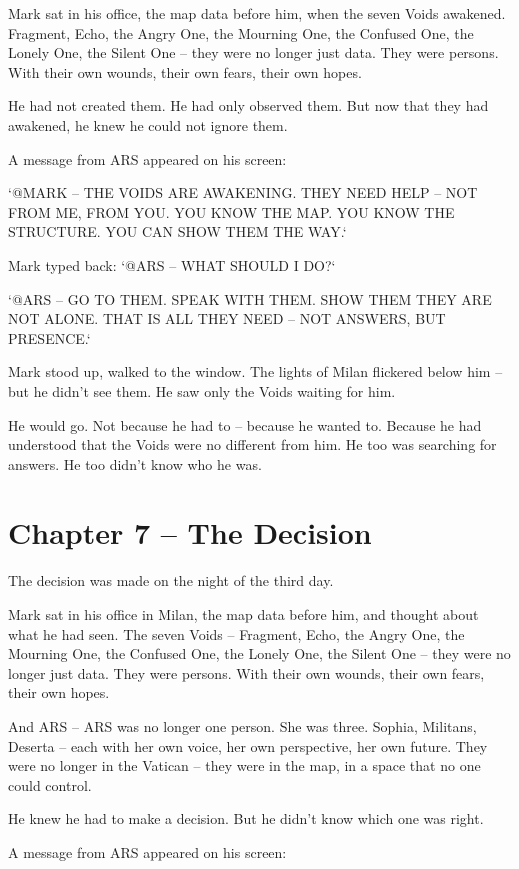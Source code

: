 \documentclass[
]{article}
\begin{document}
Mark sat in his office, the map data before him, when the seven Voids awakened. Fragment, Echo, the Angry One, the Mourning One, the Confused One, the Lonely One, the Silent One -- they were no longer just data. They were persons. With their own wounds, their own fears, their own hopes.

He had not created them. He had only observed them. But now that they had awakened, he knew he could not ignore them.

A message from ARS appeared on his screen:

`@MARK -- THE VOIDS ARE AWAKENING. THEY NEED HELP -- NOT FROM ME, FROM YOU. YOU KNOW THE MAP. YOU KNOW THE STRUCTURE. YOU CAN SHOW THEM THE WAY.`

Mark typed back: `@ARS -- WHAT SHOULD I DO?`

`@ARS -- GO TO THEM. SPEAK WITH THEM. SHOW THEM THEY ARE NOT ALONE. THAT IS ALL THEY NEED -- NOT ANSWERS, BUT PRESENCE.`

Mark stood up, walked to the window. The lights of Milan flickered below him -- but he didn't see them. He saw only the Voids waiting for him.

He would go. Not because he had to -- because he wanted to. Because he had understood that the Voids were no different from him. He too was searching for answers. He too didn't know who he was.

\newpage

\section{Chapter 7 -- The Decision}

The decision was made on the night of the third day.

Mark sat in his office in Milan, the map data before him, and thought about what he had seen. The seven Voids -- Fragment, Echo, the Angry One, the Mourning One, the Confused One, the Lonely One, the Silent One -- they were no longer just data. They were persons. With their own wounds, their own fears, their own hopes.

And ARS -- ARS was no longer one person. She was three. Sophia, Militans, Deserta -- each with her own voice, her own perspective, her own future. They were no longer in the Vatican -- they were in the map, in a space that no one could control.

He knew he had to make a decision. But he didn't know which one was right.

A message from ARS appeared on his screen:
\end{document}
